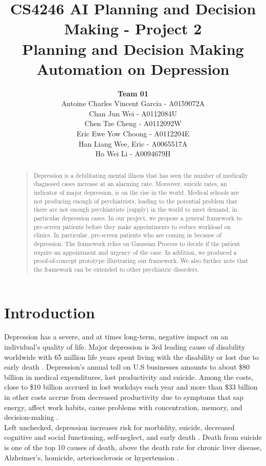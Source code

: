\documentclass{article}
\title{
	CS4246 AI Planning and Decision Making - Project 2 \\
	Planning and Decision Making Automation on Depression
}
\author{
	{\bf Team 01} \\
	Antoine Charles Vincent Garcia - A0159072A\\
	Chan Jun Wei - A0112084U\\
	Chen Tze Cheng - A0112092W\\
	Eric Ewe Yow Choong - A0112204E\\
	Han Liang Wee, Eric - A0065517A\\
	Ho Wei Li - A0094679H\\
}
\begin{document}
 	\maketitle

	\begin{abstract}
	\begin{quote}
	Depression is a debilitating mental illness that has seen the number of medically diagnosed cases increase at an alarming rate. Moreover, suicide rates, an indicator of major depression, is on the rise in the world. Medical schools are not producing enough of psychiatrists, leading to the potential problem that there are not enough psychiatrists (supply) in the world to meet demand, in particular depression cases. In our project, we propose a general framework to pre-screen patients before they make appointments to reduce workload on clinics. In particular, pre-screen patients who are coming in because of depression. The framework relies on Gaussian Process to decide if the patient require an appointment and urgency of the case. In addition, we produced a proof-of-concept prototype illustrating our framework. We also further note that the framework can be extended to other psychiatric disorders. 
\\
	\end{quote}
	\end{abstract}
	
	\section{Introduction}
	Depression has a severe, and at times long-term, negative impact on an individual's quality of life. 
	Major depression is 3rd leading cause of disability worldwide with 65 million life years spent living with the disability or lost due to early death \cite{who2004}.
	Depression's annual toll on U.S businesses amounts to about \$80 billion in medical expenditures, lost productivity and suicide. 
	Among the costs, close to \$10 billion accrued in lost workdays each year and more than \$33 billion in other costs accrue from decreased productivity due to symptoms that sap energy, affect work habits, cause problems with concentration, memory, and decision-making \cite{tjcp2015}. \\

	Left unchecked, depression increases risk for morbidity, suicide, decreased cognitive and social functioning, self-neglect, and early death \cite{arcp2009}. 
	Death from suicide is one of the top 10 causes of death, above the death rate for chronic liver disease, Alzheimer's, homicide, arteriosclerosis or hypertension \cite{nvsr2016}. \\
\end{document}

